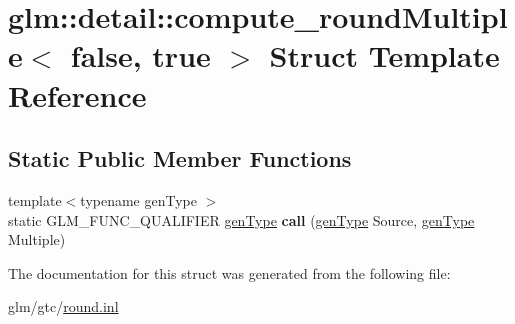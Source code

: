 \hypertarget{structglm_1_1detail_1_1compute__roundMultiple_3_01false_00_01true_01_4}{\section{glm\-:\-:detail\-:\-:compute\-\_\-round\-Multiple$<$ false, true $>$ Struct Template Reference}
\label{structglm_1_1detail_1_1compute__roundMultiple_3_01false_00_01true_01_4}
}
\subsection*{Static Public Member Functions}
\begin{DoxyCompactItemize}
\item 
\hypertarget{structglm_1_1detail_1_1compute__roundMultiple_3_01false_00_01true_01_4_a9f9791732bf5427c856feac9fed810da}{{\footnotesize template$<$typename gen\-Type $>$ }\\static G\-L\-M\-\_\-\-F\-U\-N\-C\-\_\-\-Q\-U\-A\-L\-I\-F\-I\-E\-R \hyperlink{structglm_1_1detail_1_1genType}{gen\-Type} {\bfseries call} (\hyperlink{structglm_1_1detail_1_1genType}{gen\-Type} Source, \hyperlink{structglm_1_1detail_1_1genType}{gen\-Type} Multiple)}\label{structglm_1_1detail_1_1compute__roundMultiple_3_01false_00_01true_01_4_a9f9791732bf5427c856feac9fed810da}

\end{DoxyCompactItemize}


The documentation for this struct was generated from the following file\-:\begin{DoxyCompactItemize}
\item 
glm/gtc/\hyperlink{round_8inl}{round.\-inl}\end{DoxyCompactItemize}
